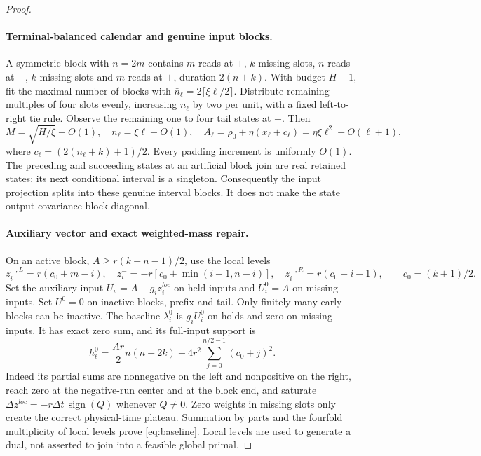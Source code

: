 \documentclass[11pt]{article}
\begin{document}
\begin{proof}
\paragraph{Terminal-balanced calendar and genuine input blocks.}
A symmetric block with $n=2m$ contains $m$ reads at $+$, $k$ missing slots,
$n$ reads at $-$, $k$ missing slots and $m$ reads at $+$, duration $2(n+k)$.
With budget $H-1$, fit the maximal number of blocks with
$\bar n_\ell=2\lceil\xi\ell/2\rceil$. Distribute remaining multiples of four
slots evenly, increasing $n_\ell$ by two per unit, with a fixed left-to-right
tie rule. Observe the remaining one to four tail states at $+$.
Then
\[
M=\sqrt{H/\xi}+O(1),\quad n_\ell=\xi\ell+O(1),\quad
A_\ell=\rho_0+\eta(x_\ell+c_\ell)=\eta\xi\ell^2+O(\ell+1),
\]
where $c_\ell=(2(n_\ell+k)+1)/2$.
Every padding increment is uniformly $O(1)$.
The preceding and succeeding states at an artificial block join are real
retained states; its next conditional interval is a singleton.
Consequently the input projection splits into these genuine interval blocks.
It does not make the state output covariance block diagonal.

\paragraph{Auxiliary vector and exact weighted-mass repair.}
On an active block, $A\ge r(k+n-1)/2$, use the local levels
\[
z_i^{+,L}=r(c_0+m-i),\quad
z_i^-=-r[c_0+\min(i-1,n-i)],\quad
z_i^{+,R}=r(c_0+i-1),\qquad c_0=(k+1)/2.
\]
Set the auxiliary input $U_i^0=A-g_i z_i^{loc}$ on held inputs and $U_i^0=A$
on missing inputs. Set $U^0=0$ on inactive blocks, prefix and tail.
Only finitely many early blocks can be inactive.
The baseline $\lambda_i^0$ is $g_iU_i^0$ on holds and zero on missing inputs.
It has exact zero sum, and its full-input support is
\begin{equation}\label{eq:baseline}
h_\ell^0=\frac{Ar}{2}n(n+2k)-4r^2\sum_{j=0}^{n/2-1}(c_0+j)^2.
\end{equation}
Indeed its partial sums are nonnegative on the left and nonpositive on the
right, reach zero at the negative-run center and at the block end, and saturate
$\Delta z^{loc}=-r\Delta t\,\operatorname{sign}(Q)$ whenever $Q\ne0$.
Zero weights in missing slots only create the correct physical-time plateau.
Summation by parts and the fourfold multiplicity of local levels prove
\eqref{eq:baseline}. Local levels are used to generate a dual, not asserted
to join into a feasible global primal.


\end{proof}
\end{document}
